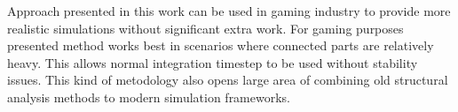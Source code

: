 Approach presented in this work can be used in gaming industry to provide more realistic 
simulations without significant extra work. For gaming purposes presented method works 
best in scenarios where connected parts are relatively heavy. This allows normal 
integration timestep to be used without stability issues. 
This kind of metodology also opens large area of combining old structural analysis
methods to modern simulation frameworks.

